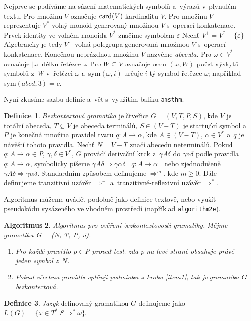 \documentclass[a4paper,twocolumn,11pt]{article}
\theoremstyle{definition}
\newtheorem{define}{Definice}[section]
\newtheorem{algor}[define]{Algoritmus}
\theoremstyle{plain}
\begin{document}
Nejprve se podíváme na sázení matematických symbolů a~výrazů v~plynulém textu. Pro množinu $V$ označuje $\makebox{card}(V)$ kardinalitu $V$. Pro množinu $V$ reprezentuje $V^*$ volný monoid generovaný množinou $V$ s~operací konkatenace.
Prvek identity ve volném monoidu $V^*$ značíme symbolem $\varepsilon$
Nechť $V^+ =V^* - \{\varepsilon\}$ Algebraicky je tedy $V^+$ volná pologrupa generovaná množinou $V$ s~operací konkatenace.
Konečnou neprázdnou množinu $V$ nazvěme \emph{abeceda}.
Pro $\omega \in V^*$ označuje $|\omega|$ délku řetězce $\omega$ Pro $W \subseteq V$ označuje $\mbox{occur}(\omega,W)$ počet výskytů symbolů z~$W$ v~řetězci $\omega$ a~sym$(\omega,i)$ určuje $i$-tý symbol řetězce $\omega$; například sym$(abcd,3) = c$.
\par Nyní zkusíme sazbu definic a~vět s~využitím balíku \texttt{amsthm}.
\begin{define} \label{def1}
\emph{Bezkontextová gramatika} je čtveřice $G = (V,T,P,S)$, kde $V$ je totální abeceda, $T \subseteq V$ je abeceda terminálů, $S \in (V-T)$ je startující symbol a~$P$ je konečná množina pravidel tvaru $q: A \to \alpha$, kde $A \in (V-T)$, $\alpha \in V^*$ a~$q$ je návěští tohoto pravidla. Nechť $N = V - T$ značí abecedu neterminálů. Pokud $q\colon A \to \alpha \in P$, $\gamma, \delta \in V^*$, $G$ provádí derivační krok z~$\gamma A \delta$ do $\gamma\alpha\delta$ podle pravidla $q\colon A \to \alpha$, symbolicky píšeme $\gamma A \delta \Rightarrow \gamma\alpha\delta\ [q\colon A \to \alpha]$ nebo zjednodušeně $\gamma A \delta \Rightarrow \gamma\alpha\delta$. Standardním způsobem definujeme $\Rightarrow^m$, kde $m \geq 0$. Dále definujeme tranzitivní uzávěr $\Rightarrow^+$ a~tranzitivně-reflexivní uzávěr $\Rightarrow^*$.
\end{define}
\par Algoritmus můžeme uvádět podobně jako definice textově, nebo využít pseudokódu vysázeného ve vhodném prostředí (například \texttt{algorithm2e}).
\begin{algor}
 \emph{Algoritmus pro ověření bezkontextovosti gramatiky. Mějme gramatiku G = (N, T, P, S).}
\begin{enumerate}
	\item \label{item1} \emph {Pro každé pravidlo $p \in P$ proveď test, zda $p$ na levé straně obsahuje právě jeden symbol z~$N$.}
	\item \emph{Pokud všechna pravidla splňují podmínku z~kroku \ref{item1}, tak je gramatika $G$ bezkontextová.} 

\end{enumerate}
\end{algor}
\begin{define}
\emph{Jazyk} definovaný gramatikou $G$ definujeme jako $L(G)=\{\omega \in T^*|S \Rightarrow^* \omega \}$.
\end{define}
\end{document}
